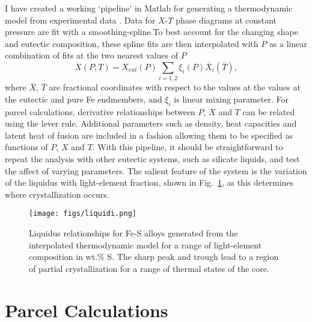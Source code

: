 I have created a working `pipeline' in Matlab for generating a thermodynamic model from
experimental data \cite{Brett1969,Fei1997,Chen2008,Stewart2007}. Data for 
$X$-$T$ phase diagrams at constant
pressure are fit with a smoothing-spline.To best account for the changing
shape and eutectic composition, these spline fits are then
interpolated with $P$ as a linear combination of fits at the two nearest
values of $P$
\begin{equation}
  X(P,T) = X_{eut}(P)\sum_{i=1,2}\xi_i(P)\bar{X}_i(\bar{T}),
\end{equation}
where $\bar{X}$, $\bar{T}$ are fractional coordinates with respect to the
values at the values at the eutectic and pure Fe endmembers, and $\xi_i$
is linear mixing parameter. For parcel
calculations, derivative relationships between $P$, $X$ and $T$ can be related
using the lever rule. Additional parameters such as density, heat capacities
and latent heat of fusion are included in a fashion allowing them to be
specified as functions of $P$, $X$ and $T$. With this pipeline, it should be
straightforward to repeat the analysis with other eutectic systems, such as
silicate liquids, and test the affect of varying parameters.
The salient feature of the system is the variation of the
liquidus with light-element fraction, shown in Fig.~\ref{fig:liquidi}, as this
determines where crystallization occurs.

 \begin{figure}[H] %
   \centering
   \texttt{[image: figs/liquidi.png]} 
   \caption{Liquidus relationships for Fe-S alloys generated from the interpolated thermodynamic 
   model for a range of light-element composition in wt.\% S. The sharp peak and trough lead to 
   a region of partial crystallization for a range of thermal states of the core.}
   \label{fig:liquidi}
\end{figure}

\section{Parcel Calculations}


